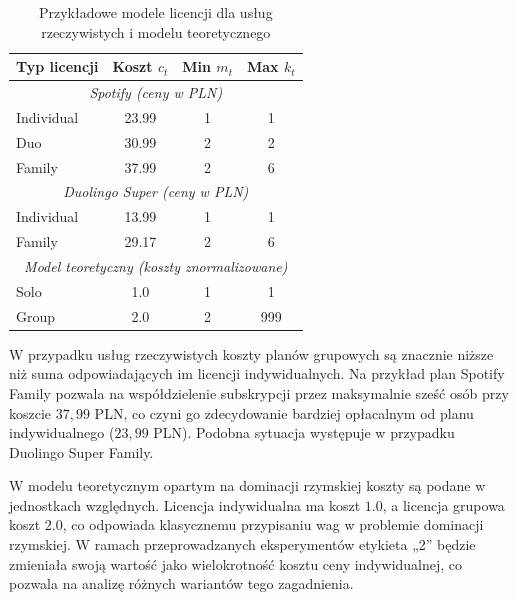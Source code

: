 \begin{table}[h!]
\centering
\caption{Przykładowe modele licencji dla usług rzeczywistych i modelu teoretycznego}
\label{tab:license_models_real}
\begin{tabular}{lccc}
\hline
\textbf{Typ licencji} & \textbf{Koszt $c_t$} & \textbf{Min $m_t$} & \textbf{Max $k_t$} \\
\hline
\multicolumn{4}{c}{\textit{Spotify (ceny w PLN)}} \\
Individual & 23.99 & 1 & 1 \\
Duo        & 30.99 & 2 & 2 \\
Family     & 37.99 & 2 & 6 \\
\hline
\multicolumn{4}{c}{\textit{Duolingo Super (ceny w PLN)}} \\
Individual & 13.99 & 1 & 1 \\
Family     & 29.17 & 2 & 6 \\
\hline
\multicolumn{4}{c}{\textit{Model teoretyczny (koszty znormalizowane)}} \\
Solo       & 1.0   & 1 & 1 \\
Group      & 2.0   & 2 & 999 \\
\hline
\end{tabular}
\end{table}

W przypadku usług rzeczywistych koszty planów grupowych są znacznie niższe niż suma odpowiadających im licencji indywidualnych. Na przykład plan Spotify Family pozwala na współdzielenie subskrypcji przez maksymalnie sześć osób przy koszcie $37{,}99$ PLN, co czyni go zdecydowanie bardziej opłacalnym od planu indywidualnego ($23{,}99$ PLN). Podobna sytuacja występuje w przypadku Duolingo Super Family.

W modelu teoretycznym opartym na dominacji rzymskiej koszty są podane w jednostkach względnych. Licencja indywidualna ma koszt $1.0$, a licencja grupowa koszt $2.0$, co odpowiada klasycznemu przypisaniu wag w problemie dominacji rzymskiej. W ramach przeprowadzanych eksperymentów etykieta „2” będzie zmieniała swoją wartość jako wielokrotność kosztu ceny indywidualnej, co pozwala na analizę różnych wariantów tego zagadnienia.





